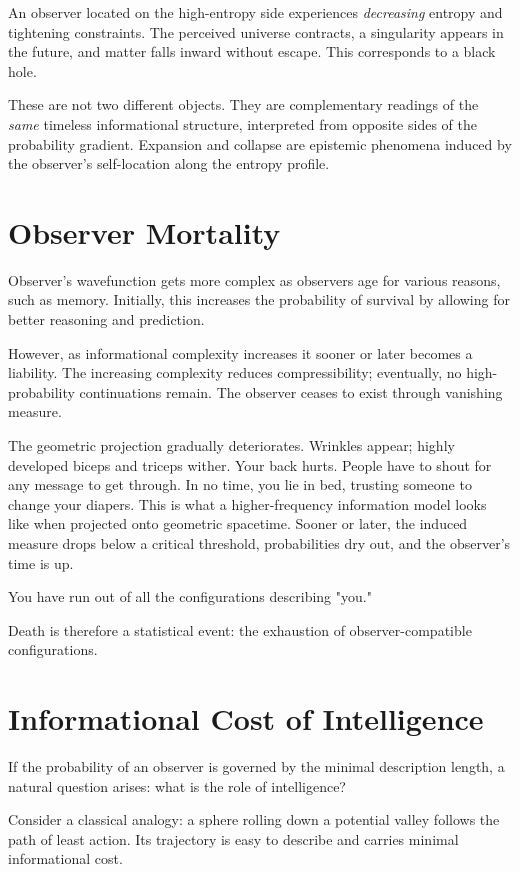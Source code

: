 An observer located on the high-entropy side experiences \emph{decreasing} entropy and tightening constraints.
The perceived universe contracts, a singularity appears in the future, and matter falls inward without escape.
This corresponds to a black hole.

These are not two different objects. They are complementary readings of the \emph{same} timeless informational structure,
interpreted from opposite sides of the probability gradient.
Expansion and collapse are epistemic phenomena induced by the observer’s self-location along the entropy profile.


\section{Observer Mortality}

Observer's wavefunction gets more complex as observers age for various reasons, such as memory.
Initially, this increases the probability of survival by allowing for better reasoning and prediction.

However, as informational complexity increases it sooner or later becomes a liability.
The increasing complexity reduces compressibility; eventually, no high-probability continuations remain.
The observer ceases to exist through vanishing measure.

The geometric projection gradually deteriorates.
Wrinkles appear; highly developed biceps and triceps wither.
Your back hurts. People have to shout for any message to get through.
In no time, you lie in bed, trusting someone to change your diapers.
This is what a higher-frequency information model looks like when projected onto geometric spacetime.
Sooner or later, the induced measure drops below a critical threshold, probabilities dry out, and the observer's time is up.

You have run out of all the configurations describing "you."

Death is therefore a statistical event: the exhaustion of observer-compatible configurations.


\section{Informational Cost of Intelligence}

If the probability of an observer is governed by the minimal description length, 
a natural question arises: what is the role of intelligence?

Consider a classical analogy: a sphere rolling down a potential valley follows the path of least action.
Its trajectory is easy to describe and carries minimal informational cost.

